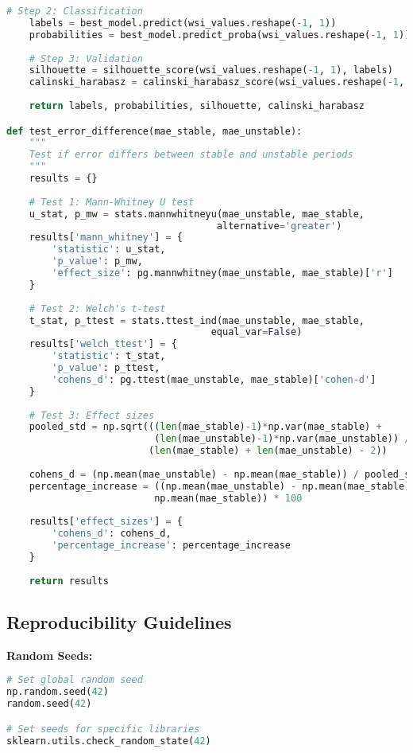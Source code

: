 \documentclass[11pt,a4paper]{article}
\begin{document}
\begin{lstlisting}[language=Python]
    # Step 2: Classification
    labels = best_model.predict(wsi_values.reshape(-1, 1))
    probabilities = best_model.predict_proba(wsi_values.reshape(-1, 1))
    
    # Step 3: Validation
    silhouette = silhouette_score(wsi_values.reshape(-1, 1), labels)
    calinski_harabasz = calinski_harabasz_score(wsi_values.reshape(-1, 1), labels)
    
    return labels, probabilities, silhouette, calinski_harabasz

def test_error_difference(mae_stable, mae_unstable):
    """
    Test if error differs between stable and unstable periods
    """
    results = {}
    
    # Test 1: Mann-Whitney U test
    u_stat, p_mw = stats.mannwhitneyu(mae_unstable, mae_stable, 
                                     alternative='greater')
    results['mann_whitney'] = {
        'statistic': u_stat,
        'p_value': p_mw,
        'effect_size': pg.mannwhitney(mae_unstable, mae_stable)['r']
    }
    
    # Test 2: Welch's t-test
    t_stat, p_ttest = stats.ttest_ind(mae_unstable, mae_stable, 
                                    equal_var=False)
    results['welch_ttest'] = {
        'statistic': t_stat,
        'p_value': p_ttest,
        'cohens_d': pg.ttest(mae_unstable, mae_stable)['cohen-d']
    }
    
    # Test 3: Effect sizes
    pooled_std = np.sqrt(((len(mae_stable)-1)*np.var(mae_stable) + 
                          (len(mae_unstable)-1)*np.var(mae_unstable)) / 
                         (len(mae_stable) + len(mae_unstable) - 2))
    
    cohens_d = (np.mean(mae_unstable) - np.mean(mae_stable)) / pooled_std
    percentage_increase = ((np.mean(mae_unstable) - np.mean(mae_stable)) / 
                          np.mean(mae_stable)) * 100
    
    results['effect_sizes'] = {
        'cohens_d': cohens_d,
        'percentage_increase': percentage_increase
    }
    
    return results
\end{lstlisting}

\subsection{Reproducibility Guidelines}

\textbf{Random Seeds:}
\begin{lstlisting}[language=Python]
# Set global random seed
np.random.seed(42)
random.seed(42)

# Set seeds for specific libraries
sklearn.utils.check_random_state(42)
\end{lstlisting}
\end{document}
